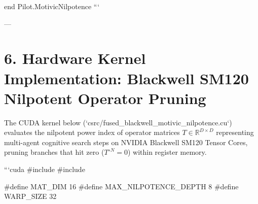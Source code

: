\documentclass[11pt,twoside,openright]{amsbook}
\begin{document}
end Pilot.MotivicNilpotence
```

---

\section{6. Hardware Kernel Implementation: Blackwell SM120 Nilpotent Operator Pruning}

The CUDA kernel below (`csrc/fused_blackwell_motivic_nilpotence.cu`) evaluates the nilpotent power index of operator matrices $T \in \mathbb{R}^{D \times D}$ representing multi-agent cognitive search steps on NVIDIA Blackwell SM120 Tensor Cores, pruning branches that hit zero ($T^{\circ N} = 0$) within register memory.

```cuda
#include 
#include 

#define MAT_DIM 16
#define MAX_NILPOTENCE_DEPTH 8
#define WARP_SIZE 32
\end{document}
